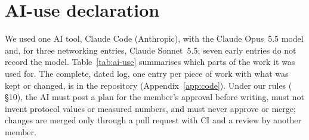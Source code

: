 \section{AI-use declaration}
\label{app:ai-use}

We used one AI tool, Claude Code (Anthropic), with the Claude Opus~5.5 model and, for three
networking entries, Claude Sonnet~5.5; seven early entries do not record the model.
Table~\ref{tab:ai-use} summarises which parts of the work it was used for. The complete, dated
log, one entry per piece of work with what was kept or changed, is 
in the repository (Appendix~\ref{app:code}). Under our rules ( §10), the AI must
post a plan for the member's approval before writing, must not invent protocol values or measured
numbers, and must never approve or merge; changes are merged only through a pull request with CI
and a review by another member.

